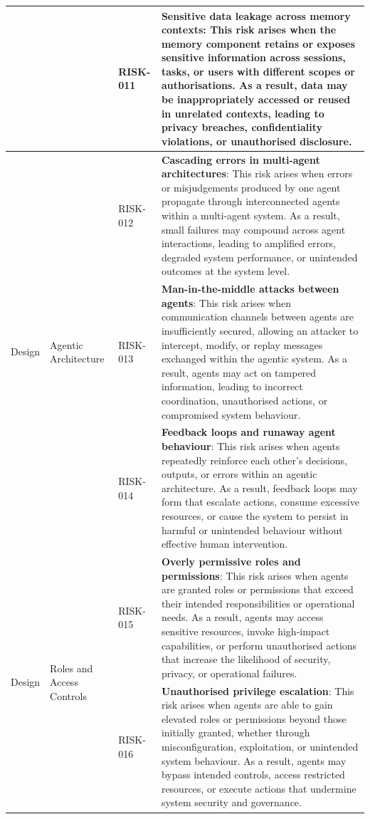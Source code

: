\documentclass{article}
\begin{document}
\begin{longtable}{|p{}|p{}|p{}|p{}|}
& & RISK-011 & \textbf{Sensitive data leakage across memory contexts}: This risk arises when the memory component retains or exposes sensitive information across sessions, tasks, or users with different scopes or authorisations. As a result, data may be inappropriately accessed or reused in unrelated contexts, leading to privacy breaches, confidentiality violations, or unauthorised disclosure. \\ \hline
\multirow{3}{=}{Design}
& \multirow{3}{=}{Agentic Architecture}
& RISK-012 & \textbf{Cascading errors in multi-agent architectures}: This risk arises when errors or misjudgements produced by one agent propagate through interconnected agents within a multi-agent system. As a result, small failures may compound across agent interactions, leading to amplified errors, degraded system performance, or unintended outcomes at the system level. \\ \cline{3-4}
& & RISK-013 & \textbf{Man-in-the-middle attacks between agents}: This risk arises when communication channels between agents are insufficiently secured, allowing an attacker to intercept, modify, or replay messages exchanged within the agentic system. As a result, agents may act on tampered information, leading to incorrect coordination, unauthorised actions, or compromised system behaviour. \\ \cline{3-4}
& & RISK-014 & \textbf{Feedback loops and runaway agent behaviour}: This risk arises when agents repeatedly reinforce each other's decisions, outputs, or errors within an agentic architecture. As a result, feedback loops may form that escalate actions, consume excessive resources, or cause the system to persist in harmful or unintended behaviour without effective human intervention. \\ \hline
\multirow{2}{=}{Design}
& \multirow{2}{=}{Roles and Access Controls}
& RISK-015 & \textbf{Overly permissive roles and permissions}: This risk arises when agents are granted roles or permissions that exceed their intended responsibilities or operational needs. As a result, agents may access sensitive resources, invoke high-impact capabilities, or perform unauthorised actions that increase the likelihood of security, privacy, or operational failures. \\ \cline{3-4}
& & RISK-016 & \textbf{Unauthorised privilege escalation}: This risk arises when agents are able to gain elevated roles or permissions beyond those initially granted, whether through misconfiguration, exploitation, or unintended system behaviour. As a result, agents may bypass intended controls, access restricted resources, or execute actions that undermine system security and governance. \\ \hline

\end{longtable}
\end{document}
